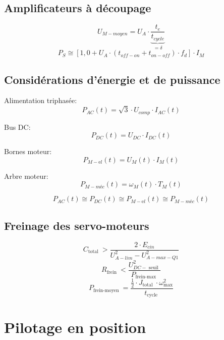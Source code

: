 \documentclass[10pt]{article} %
\begin{document}
\begin{multicols}{3}
\begin{flushleft}
		
		
		\subsection*{Amplificateurs à découpage}
			
			\[U_{M-m o y e n}=U_{A} \cdot \underbrace{\frac{t_{e}}{t_{c y c l e}}}_{=\delta}\]
			\[P_{S} \cong\left[1,0+U_{A} \cdot\left(t_{o f f-o n}+t_{o n-o f f}\right) \cdot f_{d}\right] \cdot I_{M}\]
			
		\subsection*{Considérations d'énergie et de puissance}
			
			Alimentation triphasée:
			\[P_{A C}(t)=\sqrt{3} \cdot U_{c o m p} \cdot I_{A C}(t)\]
			
			Bus DC:
			\[P_{D C}(t)=U_{D C} \cdot I_{D C}(t)\]
			
			Bornes moteur:
			\[P_{M-\mathrm{e} l}(t)=U_{M}(t) \cdot I_{M}(t)\]
			
			Arbre moteur:
			\[P_{M-m é c}(t)=\omega_{M}(t) \cdot T_{M}(t)\]
			
			\[P_{A C}(t) \cong P_{D C}(t) \cong P_{M-\mathrm{e} l}(t) \cong P_{M-m é c}(t)\]
			
		\subsection*{Freinage des servo-moteurs}
			
			\[C_{\text {total }}>\frac{2 \cdot E_{c i n}}{U_{A-l i m}^{2}-U_{A-m a x-Q 1}^{2}}\]
			\[R_{\text {frein }}<\frac{U_{D C-\text { seuil }}^{2}}{P_{\text {frein-max }}}\]
			\[P_{\text {frein-moyen }}=\frac{\frac{1}{2} \cdot J_{\text {total }} \cdot \omega_{\max }^{2}}{t_{\text {cycle }}}\]
			
	\section*{Pilotage en position}
		

\end{flushleft}
\end{multicols}
\end{document}
